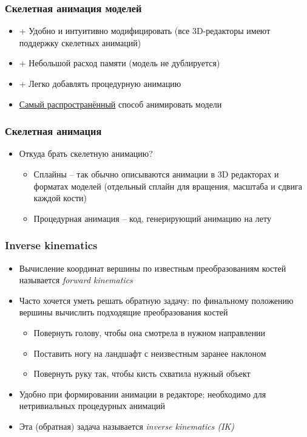 \documentclass[10pt]{beamer}
\begin{document}
\begin{frame}[fragile]
\frametitle{Скелетная анимация моделей}
\begin{itemize}
\item {\color{green}+} Удобно и интуитивно модифицировать (все 3D-редакторы имеют поддержку скелетных анимаций)
\pause
\item {\color{green}+} Небольшой расход памяти (модель не дублируется)
\pause
\item {\color{green}+} Легко добавлять процедурную анимацию
\pause
\item \underline{Самый распространённый} способ анимировать модели
\end{itemize}
\end{frame}

\begin{frame}[fragile]
\frametitle{Скелетная анимация}
\begin{itemize}
\item Откуда брать скелетную анимацию?
\pause
\begin{itemize}
\item Сплайны -- так обычно описываются анимации в 3D редакторах и форматах моделей (отдельный сплайн для вращения, масштаба и сдвига каждой кости)
\pause
\item Процедурная анимация -- код, генерирующий анимацию на лету
\end{itemize}
\end{itemize}
\end{frame}

\begin{frame}[fragile]
\frametitle{Inverse kinematics}
\begin{itemize}
\item Вычисление координат вершины по известным преобразованиям костей называется \textit{forward kinematics}
\pause
\item Часто хочется уметь решать обратную задачу: по финальному положению вершины вычислить подходящие преобразования костей
\pause
\begin{itemize}
\item Повернуть голову, чтобы она смотрела в нужном направлении
\pause
\item Поставить ногу на ландшафт с неизвестным заранее наклоном
\pause
\item Повернуть руку так, чтобы кисть схватила нужный объект
\end{itemize}
\pause
\item Удобно при формировании анимации в редакторе; необходимо для нетривиальных процедурных анимаций
\pause
\item Эта (обратная) задача называется \textit{inverse kinematics (IK)}
\end{itemize}
\end{frame}
\end{document}
